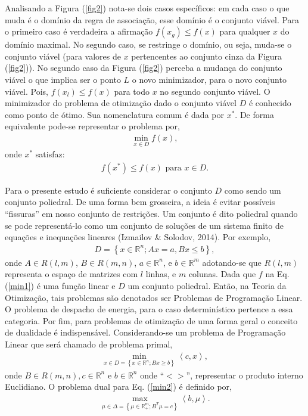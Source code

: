 \documentclass[12pt,fleqn]{article}
\begin{document}
Analisando a Figura (\ref{fig2}) nota-se dois casos espec\'ificos: em cada caso o que muda \'e o dom\'inio da regra de associa\c c\~ao, esse dom\'inio \'e o conjunto vi\'avel. Para o primeiro caso \'e verdadeira a afirma\c c\~ao $f(x_g)
\leq f(x)$ para qualquer $x$ do dom\'inio maximal. No segundo caso, se restringe o dom\'inio, ou seja, muda-se o conjunto vi\'avel (para valores de $x$ pertencentes ao conjunto cinza da Figura (\ref{fig2})). No segundo caso da Figura (\ref{fig2}) perceba a mudan\c ca do conjunto vi\'avel o que implica ser o ponto $L$ o novo minimizador, para o novo conjunto vi\'avel. Pois, $f(x_l) \leq f(x)$ para todo $x$ no segundo conjunto vi\'avel. O  minimizador do problema de
otimiza\c c\~ao dado o conjunto vi\'avel $D$ \'e conhecido como ponto de \'otimo. Sua nomenclatura comum \'e dada por ${x}^{*}$.  De forma equivalente pode-se
representar o problema por,
\begin{align}
\label {min1}
  \min_{x\in D} f(x),
\end{align}
onde ${x}^{*}$ satisfaz:
\begin{align}
	  f({x}^{*}) \leq f(x) \mbox{ para }x \in D. \nonumber
\end{align}

Para o presente estudo \'e suficiente considerar o conjunto $D$ como sendo um conjunto poliedral. De uma forma bem grosseira, a ideia \'e evitar
poss\'iveis ``fissuras'' em nosso conjunto de restri\c c\~oes. Um conjunto  \'e dito poliedral  quando se pode represent\'a-lo como um conjunto de solu\c c\~oes de um sistema finito de equa\c c\~oes e inequa\c c\~oes lineares (Izmailov \& Solodov, 2014). Por exemplo,
\begin{align}
  D = \left\{ x \in \mathbb{R}^{n}; Ax = a, Bx \leq b\right\},\nonumber
\end{align}
onde $A \in R(l,m)$, $B \in R(m,n)$, $a \in \mathbb{R}^{n}$, e $b \in \mathbb{R}^{m}$ adotando-se que $R(l,m)$ representa o
espa\c co de matrizes com $l$ linhas, e $m$ colunas. Dada que $f$ na Eq.(\ref {min1}) \'e uma fun\c c\~ao linear e $D$ um conjunto
poliedral. Ent\~ao, na Teoria da Otimiza\c c\~ao, tais problemas s\~ao denotados ser Problemas de Programa\c c\~ao Linear. O problema de despacho de energia, para o caso determin\'istico pertence a essa categoria. Por fim, para problemas de otimiza\c c\~ao de uma forma geral o conceito de dualidade \'e
indispens\'avel. Considerando-se um problema de Programa\c c\~ao Linear que ser\'a chamado de problema primal,
\begin{align}
  \displaystyle\min_{ x \in D = \left\{ x \in \mathbb{R}^{n}; Bx \geq b \right\}} \left < c,x \right >, 
  \label{min2}
\end{align}
onde $B \in R(m,n), c \in \mathbb{R}^{n}$ e $b \in \mathbb{R}^{n}$ onde ``$< >$'', representar o produto interno Euclidiano.
O problema dual para Eq. (\ref{min2}) \'e definido por,
\begin{align*}
  \max_{\mu \in \Delta = \left\{ \mu \in \mathbb{R}_+^m;
  {B}^{T} \mu = c \right\}} \left < b, \mu \right > .
\end{align*}
\end{document}
